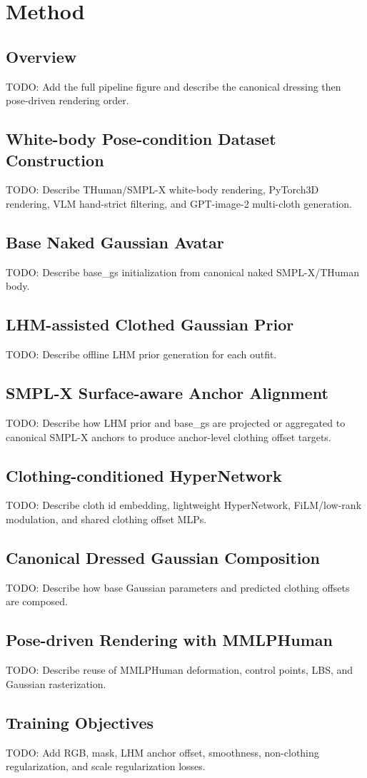 \section{Method}

\subsection{Overview}
TODO: Add the full pipeline figure and describe the canonical dressing then pose-driven rendering order.

\subsection{White-body Pose-condition Dataset Construction}
TODO: Describe THuman/SMPL-X white-body rendering, PyTorch3D rendering, VLM hand-strict filtering, and GPT-image-2 multi-cloth generation.

\subsection{Base Naked Gaussian Avatar}
TODO: Describe base\_gs initialization from canonical naked SMPL-X/THuman body.

\subsection{LHM-assisted Clothed Gaussian Prior}
TODO: Describe offline LHM prior generation for each outfit.

\subsection{SMPL-X Surface-aware Anchor Alignment}
TODO: Describe how LHM prior and base\_gs are projected or aggregated to canonical SMPL-X anchors to produce anchor-level clothing offset targets.

\subsection{Clothing-conditioned HyperNetwork}
TODO: Describe cloth id embedding, lightweight HyperNetwork, FiLM/low-rank modulation, and shared clothing offset MLPs.

\subsection{Canonical Dressed Gaussian Composition}
TODO: Describe how base Gaussian parameters and predicted clothing offsets are composed.

\subsection{Pose-driven Rendering with MMLPHuman}
TODO: Describe reuse of MMLPHuman deformation, control points, LBS, and Gaussian rasterization.

\subsection{Training Objectives}
TODO: Add RGB, mask, LHM anchor offset, smoothness, non-clothing regularization, and scale regularization losses.
